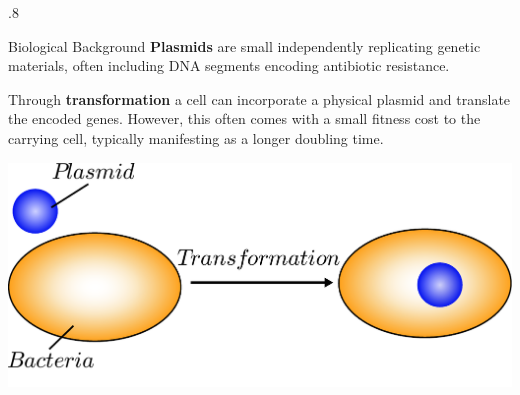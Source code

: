 \documentclass[final]{beamer}
\newlength{\sepwid}
\newlength{\onecolwid}
\newlength{\figwid}
\begin{document}
\begin{frame}[t]
\begin{block}
\begin{columns}[t]
\begin{column}{.8\onecolwid}
  \begin{alertblock}{Biological Background}
    \textbf{Plasmids} are small independently replicating genetic materials,
    often including DNA segments encoding antibiotic resistance.

    \quad\quad Through \textbf{transformation} a cell can incorporate
    a physical plasmid and translate the encoded genes. However, this often
    comes with a small fitness cost to the carrying cell, typically manifesting
    as a longer doubling time.


    \begin{center}
      \includegraphics[width=.7\figwid]{../dev/graphics/poster/transformation.pdf}
    \end{center}

    \vspace{2.2ex}
  \end{alertblock}
\end{column}



\end{columns}
\end{block}
\end{frame}
\end{document}
